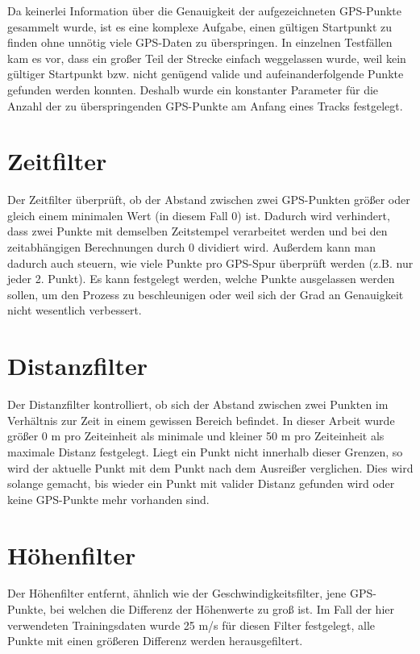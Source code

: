 
Da keinerlei Information über die Genauigkeit der aufgezeichneten GPS-Punkte gesammelt wurde, ist es eine komplexe Aufgabe, einen gültigen Startpunkt zu finden ohne unnötig viele GPS-Daten zu überspringen. In einzelnen Testfällen kam es vor, dass ein großer Teil der Strecke einfach weggelassen wurde, weil kein gültiger Startpunkt bzw. nicht genügend valide und aufeinanderfolgende Punkte gefunden werden konnten. Deshalb wurde ein konstanter Parameter für die Anzahl der zu überspringenden GPS-Punkte am Anfang eines Tracks festgelegt.

\section*{Zeitfilter}
Der Zeitfilter überprüft, ob der Abstand zwischen zwei GPS-Punkten größer oder gleich einem minimalen Wert (in diesem Fall 0) ist. Dadurch wird verhindert, dass zwei Punkte mit demselben Zeitstempel verarbeitet werden und bei den zeitabhängigen Berechnungen durch 0 dividiert wird. Außerdem kann man dadurch auch steuern, wie viele Punkte pro GPS-Spur überprüft werden  (z.B. nur jeder 2. Punkt). Es kann festgelegt werden, welche Punkte ausgelassen werden sollen, um den Prozess zu beschleunigen oder weil sich der Grad an Genauigkeit nicht wesentlich verbessert.

\section*{Distanzfilter}
Der Distanzfilter kontrolliert, ob sich der Abstand zwischen zwei Punkten im Verhältnis zur Zeit in einem gewissen Bereich befindet. In dieser Arbeit wurde größer 0 m pro Zeiteinheit als minimale und kleiner 50 m pro Zeiteinheit als maximale Distanz festgelegt. Liegt ein Punkt nicht innerhalb dieser Grenzen, so wird der aktuelle Punkt mit dem Punkt nach dem Ausreißer verglichen. Dies wird solange gemacht, bis wieder ein Punkt mit valider Distanz gefunden wird oder keine GPS-Punkte mehr vorhanden sind.

\section*{Höhenfilter}
Der Höhenfilter entfernt, ähnlich wie der Geschwindigkeitsfilter, jene GPS-Punkte, bei welchen die Differenz der Höhenwerte zu groß ist. Im Fall der hier verwendeten Trainingsdaten wurde 25 m/s  für diesen Filter festgelegt,  alle Punkte mit einen größeren Differenz werden herausgefiltert.

